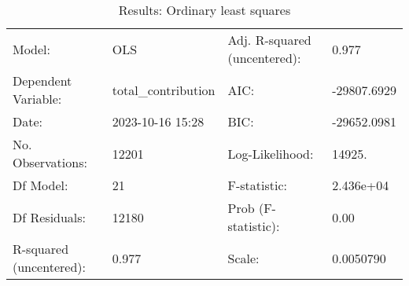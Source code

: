 \begin{table}
\caption{Results: Ordinary least squares}
\label{}
\begin{center}
\begin{tabular}{llll}
\hline
Model:                  & OLS                 & Adj. R-squared (uncentered): & 0.977        \\
Dependent Variable:     & total\_contribution & AIC:                         & -29807.6929  \\
Date:                   & 2023-10-16 15:28    & BIC:                         & -29652.0981  \\
No. Observations:       & 12201               & Log-Likelihood:              & 14925.       \\
Df Model:               & 21                  & F-statistic:                 & 2.436e+04    \\
Df Residuals:           & 12180               & Prob (F-statistic):          & 0.00         \\
R-squared (uncentered): & 0.977               & Scale:                       & 0.0050790    \\
\hline
\end{tabular}
\end{center}


\end{table}
